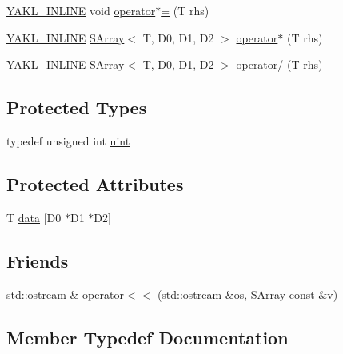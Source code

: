 \begin{DoxyCompactItemize}
\hyperlink{YAKL_8h_aa0dd629ffce6d564b19e9313fb91a5ad}{Y\+A\+K\+L\+\_\+\+I\+N\+L\+I\+NE} void \hyperlink{classyakl_1_1SArray_a872396d08f6cdbf2822cb10de54bd90c}{operator$\ast$=} (T rhs)
\item 
\hyperlink{YAKL_8h_aa0dd629ffce6d564b19e9313fb91a5ad}{Y\+A\+K\+L\+\_\+\+I\+N\+L\+I\+NE} \hyperlink{classyakl_1_1SArray}{S\+Array}$<$ T, D0, D1, D2 $>$ \hyperlink{classyakl_1_1SArray_a9001441d80759e0e532ade1e7481ec96}{operator$\ast$} (T rhs)
\item 
\hyperlink{YAKL_8h_aa0dd629ffce6d564b19e9313fb91a5ad}{Y\+A\+K\+L\+\_\+\+I\+N\+L\+I\+NE} \hyperlink{classyakl_1_1SArray}{S\+Array}$<$ T, D0, D1, D2 $>$ \hyperlink{classyakl_1_1SArray_a6e195f9eb9440cc1f14b189810b77d63}{operator/} (T rhs)
\end{DoxyCompactItemize}
\subsection*{Protected Types}
\begin{DoxyCompactItemize}
\item 
typedef unsigned int \hyperlink{classyakl_1_1SArray_a777ad93441c16e786309b27e40bc56f0}{uint}
\end{DoxyCompactItemize}
\subsection*{Protected Attributes}
\begin{DoxyCompactItemize}
\item 
T \hyperlink{classyakl_1_1SArray_a6cb99563237f388b12a0ab0eb7f05d50}{data} \mbox{[}D0 $\ast$D1 $\ast$D2\mbox{]}
\end{DoxyCompactItemize}
\subsection*{Friends}
\begin{DoxyCompactItemize}
\item 
std\+::ostream \& \hyperlink{classyakl_1_1SArray_a4b832e45effde3db111a2c683b4c6d49}{operator$<$$<$} (std\+::ostream \&os, \hyperlink{classyakl_1_1SArray}{S\+Array} const \&v)
\end{DoxyCompactItemize}


\subsection{Member Typedef Documentation}
\mbox{\label{classyakl_1_1SArray_a777ad93441c16e786309b27e40bc56f0}} 
